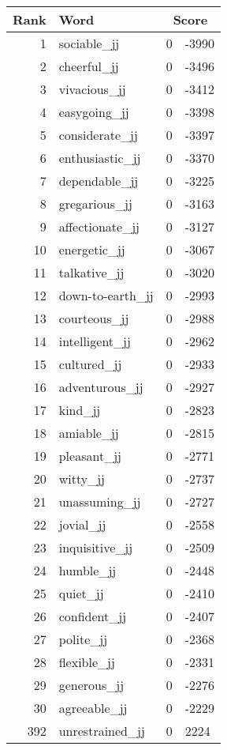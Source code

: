\begin{longtable}[!htbp]{| rlr@{.}l |}
    \hline
    \textbf{Rank} & \textbf{Word} & \multicolumn{2}{c|}{\textbf{Score}} \\
    \hline
    \endhead
    1 & sociable\_jj & 0 & -3990 \\
    2 & cheerful\_jj & 0 & -3496 \\
    3 & vivacious\_jj & 0 & -3412 \\
    4 & easygoing\_jj & 0 & -3398 \\
    5 & considerate\_jj & 0 & -3397 \\
    6 & enthusiastic\_jj & 0 & -3370 \\
    7 & dependable\_jj & 0 & -3225 \\
    8 & gregarious\_jj & 0 & -3163 \\
    9 & affectionate\_jj & 0 & -3127 \\
    10 & energetic\_jj & 0 & -3067 \\
    11 & talkative\_jj & 0 & -3020 \\
    12 & down-to-earth\_jj & 0 & -2993 \\
    13 & courteous\_jj & 0 & -2988 \\
    14 & intelligent\_jj & 0 & -2962 \\
    15 & cultured\_jj & 0 & -2933 \\
    16 & adventurous\_jj & 0 & -2927 \\
    17 & kind\_jj & 0 & -2823 \\
    18 & amiable\_jj & 0 & -2815 \\
    19 & pleasant\_jj & 0 & -2771 \\
    20 & witty\_jj & 0 & -2737 \\
    21 & unassuming\_jj & 0 & -2727 \\
    22 & jovial\_jj & 0 & -2558 \\
    23 & inquisitive\_jj & 0 & -2509 \\
    24 & humble\_jj & 0 & -2448 \\
    25 & quiet\_jj & 0 & -2410 \\
    26 & confident\_jj & 0 & -2407 \\
    27 & polite\_jj & 0 & -2368 \\
    28 & flexible\_jj & 0 & -2331 \\
    29 & generous\_jj & 0 & -2276 \\
    30 & agreeable\_jj & 0 & -2229 \\
    392 & unrestrained\_jj & 0 & 2224 \\

\end{longtable}
